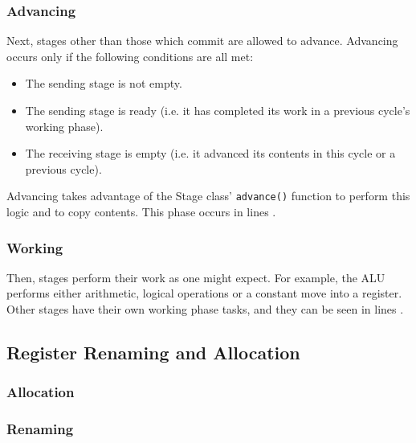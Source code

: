 \documentclass[12pt]{article}
\begin{document}
\subsubsection{Advancing}
Next, stages other than those which commit are allowed to advance.
Advancing occurs only if the following conditions are all met:
\begin{itemize}
  \item The sending stage is not empty.
  \item The sending stage is ready (i.e. it has completed its work in a previous cycle's working phase).
  \item The receiving stage is empty (i.e. it advanced its contents in this cycle or a previous cycle).
\end{itemize}
Advancing takes advantage of the Stage class' \texttt{advance()} function to perform this logic and to copy contents.
This phase occurs in lines .

\subsubsection{Working}
Then, stages perform their work as one might expect. 
For example, the ALU performs either arithmetic, logical operations or a constant move into a register.
Other stages have their own working phase tasks, and they can be seen in lines .


\subsection{Register Renaming and Allocation}
\label{sec:renamealloc}

\subsubsection{Allocation}
\label{sec:allocation}

\subsubsection{Renaming}
\label{sec:renaming}
\end{document}
